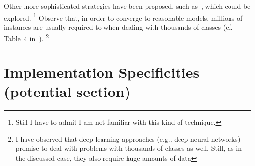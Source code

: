 \documentclass{sig-alternate-05-2015}
\begin{document}
Other more sophisticated strategies have been proposed, such 
as~\cite{JMLR:v15:gupta14a}, which could be explored.%
\footnote{Still I have to admit I am not familiar with this kind of technique.}
Observe that, in order to converge to reasonable models, millions of instances 
are usually required to when dealing with thousands of classes (cf. Table~4 
in~\cite{JMLR:v15:gupta14a}).%
\footnote{I have observed that deep learning approaches (e.g., deep 
neural networks) promise to deal with problems with thousands of classes as 
well. Still, as in the discussed case, they also require huge amounts of 
data}

\section{Implementation Specificities (potential section)}
%

%
%
\end{document}
